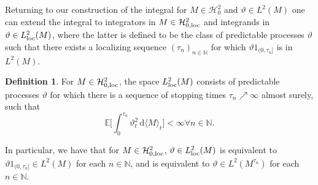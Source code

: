 \documentclass[11pt,a4paper,twoside,openany]{report}
\numberwithin{equation}{section}
\newcommand{\diff}{\mathrm{d}}
\theoremstyle{plain} %
\theoremstyle{definition} %
\newtheorem{definition}[theorem]{Definition}
\theoremstyle{remark} %
\begin{document}
Returning to our construction of the integral for \(M\in\mathcal{H}^2_0\) and \(\vartheta\in L^2(M)\) one can  extend the integral to integrators in \(M\in\mathcal{H}^2_{0,\rm{loc}}\) and integrands in \(\vartheta\in L^2_{\rm{loc}}(M)\), where the latter is defined to be the class of predictable processes \(\vartheta\) such that there exists a localizing sequence \((\tau_n)_{n\in\mathbb{N}}\) for which \(\vartheta1_{(0,\tau_n]}\) is in \(L^2(M)\). 

\begin{definition}\label{def:L^p(M)_loc}
 For \(M\in\mathcal{H}^2_{0,\rm{loc}}\), the space \(L_{\rm{loc}}^2(M)\) consists of predictable processes \(\vartheta\) for which there is  a sequence of stopping times \(\tau_n\nearrow\infty\) almost surely, such that 
    \begin{equation*}
        \mathbb{E}\bigg[\int_0^{\tau_n}\vartheta_t^2\,\diff \langle M\rangle_t\bigg]<\infty\forall n\in\mathbb{N}.
    \end{equation*}
\end{definition}
In particular, we have that for \(M\in\mathcal{H}_{0,\rm{loc}}^2\), \(\vartheta\in L^2_{\rm{loc}}(M)\) is equivalent to \(\vartheta1_{(0,\tau_n]}\in L^2(M)\) for each \(n\in\mathbb{N}\), and is equivalent to \(\vartheta\in L^2(M^{\tau_n})\) for each \(n\in\mathbb{N}\).
\end{document}
